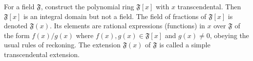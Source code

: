 For a field $\mathfrak{F}$, construct the polynomial ring $\mathfrak{F}[x]$ with $x$ transcendental. Then $\mathfrak{F}[x]$ is an integral domain but not a field. The field of fractions of $\mathfrak{F}[x]$ is denoted $\mathfrak{F}(x)$. Its elements are rational expressions (functions) in $x$ over $\mathfrak{F}$ of the form $f(x)/g(x)$ where $f(x), g(x) \in \mathfrak{F}[x]$ and $g(x) \neq 0$, obeying the usual rules of reckoning. The extension $\mathfrak{F}(x)$ of $\mathfrak{F}$ is called a simple transcendental extension.
